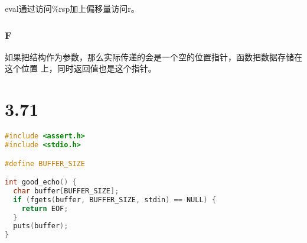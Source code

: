 \documentclass[11pt]{article}
\begin{document}
eval通过访问\%rsp加上偏移量访问r。

\subsubsection*{F}
如果把结构作为参数，那么实际传递的会是一个空的位置指针，函数把数据存储在这个位置
上，同时返回值也是这个指针。

\section*{3.71}

\begin{lstlisting}[language=c++]
#include <assert.h>
#include <stdio.h>

#define BUFFER_SIZE

int good_echo() {
  char buffer[BUFFER_SIZE];
  if (fgets(buffer, BUFFER_SIZE, stdin) == NULL) {
    return EOF;
  }
  puts(buffer);
}
\end{lstlisting}
\end{document}
